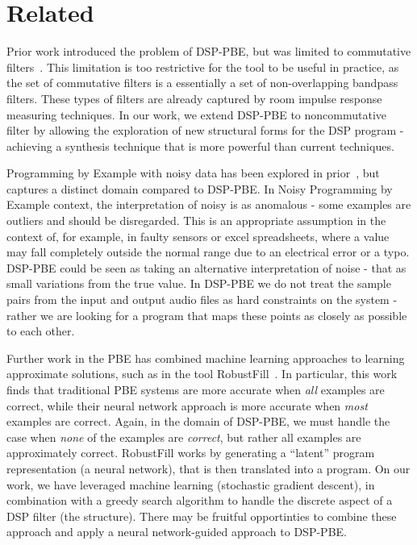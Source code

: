 \section{Related}

Prior work introduced the problem of DSP-PBE, but was limited to commutative filters~\cite{SantolucitoFARM}.
This limitation is too restrictive for the tool to be useful in practice, as the set of commutative filters is a essentially a set of non-overlapping bandpass filters.
These types of filters are already captured by room impulse response measuring techniques.
In our work, we extend DSP-PBE to noncommutative filter by allowing the exploration of new structural forms for the DSP program - achieving a synthesis technique that is more powerful than current techniques.

Programming by Example with noisy data has been explored in prior~\cite{raychev2016learning}, but captures a distinct domain compared to DSP-PBE.
In Noisy Programming by Example context, the interpretation of noisy is as anomalous - some examples are outliers and should be disregarded.
This is an appropriate assumption in the context of, for example, in faulty sensors or excel spreadsheets, where a value may fall completely outside the normal range due to an electrical error or a typo.
DSP-PBE could be seen as taking an alternative interpretation of noise - that as small variations from the true value.
In DSP-PBE we do not treat the sample pairs from the input and output audio files as hard constraints on the system - rather we are looking for a program that maps these points as closely as possible to each other.

Further work in the PBE has combined machine learning approaches to learning approximate solutions, such as in the tool RobustFill~\cite{devlin2017robustfill}.
In particular, this work finds that traditional PBE systems are more accurate when \textit{all} examples are correct, while their neural network approach is more accurate when \textit{most} examples are correct.
Again, in the domain of DSP-PBE, we must handle the case when \textit{none} of the examples are \textit{correct}, but rather all examples are approximately correct.
RobustFill works by generating a ``latent'' program representation (a neural network), that is then translated into a program.
On our work, we have leveraged machine learning (stochastic gradient descent), in combination with a greedy search algorithm to handle the discrete aspect of a DSP filter (the structure).
There may be fruitful opportinties to combine these approach and apply a neural network-guided approach to DSP-PBE.







